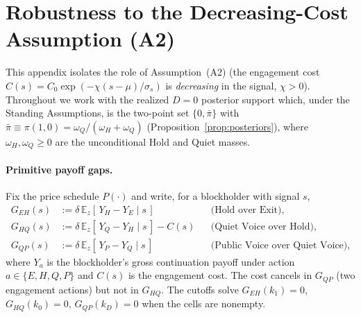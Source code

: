\documentclass[11pt]{article}
\newcommand{\E}{\mathbb{E}}
\newcommand{\1}{\mathbf{1}}
\begin{document}
\makeatletter
{}
\makeatother
\providecommand{\sgn}{\operatorname{sgn}}



\section{Robustness to the Decreasing-Cost Assumption (A2)}
\label{app:d5}

This appendix isolates the role of Assumption~\textup{(A2)} (the engagement cost $C(s)=C_0\exp(-\chi (s-\mu)/\sigma_s)$ is \emph{decreasing} in the signal, $\chi>0$). Throughout we work with the realized $D=0$ posterior support which, under the Standing Assumptions, is the two-point set $\{0,\bar\pi\}$ with $\bar\pi\equiv\pi(1,0)=\omega_Q/(\omega_H+\omega_Q)$ (Proposition~\ref{prop:posteriors}), where $\omega_H,\omega_Q\ge 0$ are the unconditional Hold and Quiet masses.

\paragraph{Primitive payoff gaps.}
Fix the price schedule $P(\cdot)$ and write, for a blockholder with signal $s$,
\begin{align*}
  G_{EH}(s) &:= \delta\,\E_z[\,Y_H - Y_E \mid s\,] &&\text{(Hold over Exit)},\\
  G_{HQ}(s) &:= \delta\,\E_z[\,Y_Q - Y_H \mid s\,] - C(s) &&\text{(Quiet Voice over Hold)},\\
  G_{QP}(s) &:= \delta\,\E_z[\,Y_P - Y_Q \mid s\,] &&\text{(Public Voice over Quiet Voice)},
\end{align*}
where $Y_a$ is the blockholder's gross continuation payoff under action $a\in\{E,H,Q,P\}$ and $C(s)$ is the engagement cost. The cost cancels in $G_{QP}$ (two engagement actions) but not in $G_{HQ}$. The cutoffs solve $G_{EH}(k_1)=0$, $G_{HQ}(k_0)=0$, $G_{QP}(k_D)=0$ when the cells are nonempty.
\end{document}
